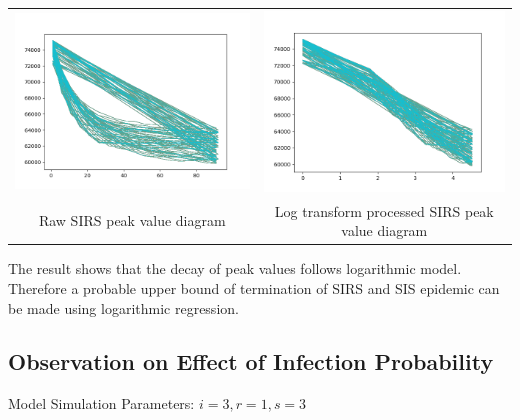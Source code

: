 \documentclass{subfile}
\begin{document}
\begin{tabular}{cc}
    \includegraphics[scale=0.5]{SIRSp05chaos} & \includegraphics[scale=0.5]{logTrSIRSp05}\\
    Raw SIRS peak value diagram & Log transform processed SIRS peak value diagram\\
  \end{tabular}

  The result shows that the decay of peak values follows logarithmic model. Therefore a probable upper bound of termination of SIRS and SIS epidemic can be made using logarithmic regression.

  \subsection{Observation on Effect of Infection Probability}
  Model Simulation Parameters: \(i=3, r=1, s=3\)
\end{document}
